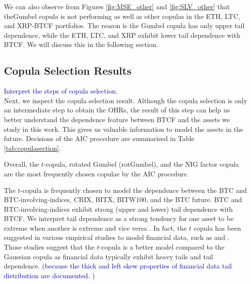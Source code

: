 We can also observe from Figures \ref{fig:MSE_other} and
\ref{fig:SLV_other} that theGumbel copula is not performing as well as 
other copulas in the ETH, LTC, and XRP-BTCF portfolios. 
The reason is the Gumbel copula has only upper tail dependence,
while the ETH, LTC, and XRP exhibit lower tail dependence with BTCF. 
We will discuss this in the following section. 

\subsection{Copula Selection Results}
\label{sec: copula results}


\textcolor{darkblue}{Interpret the steps of copula selection.} \\
Next, we inspect the copula selection result.
Although the copula selection is only an intermediate step to obtain the OHRs,
the result of this step can help us better understand the dependence
feature between BTCF and the assets we study in this work. 
This gives us valuable information to model the assets in the future.
Decisions of the AIC procedure are summarised in Table \ref{tab:copulasection}.

Overall, the $t$-copula, rotated Gumbel (rotGumbel), and the NIG
factor copula are the most frequently chosen copulae by the AIC
procedure. 

The $t$-copula is frequently chosen to model the dependence between
the BTC and BTC-involving-indices, CRIX, BITX, BITW100, and the BTC
future. 
BTC and BTC-involving-indices exhibit strong (upper and lower) tail
dependence with BTCF.  We interpret tail dependence as a strong
tendency for one asset to be extreme when another is extreme and 
vice versa \citep{McNeil2015}. 
In fact, the $t$ copula has been suggested in various empirical
studies to model financial data, such as \cite{zeevi2002beyond} and
\cite{breymann2003dependence}. 
Those studies suggest that the $t$-copula is a better model compared
to the Gaussian copula as financial data typically exhibit heavy tails
and tail dependence. \textcolor{darkblue}{(because the thick and left
  skew  properties of financial data tail distribution are documented. )}
\medskip 

